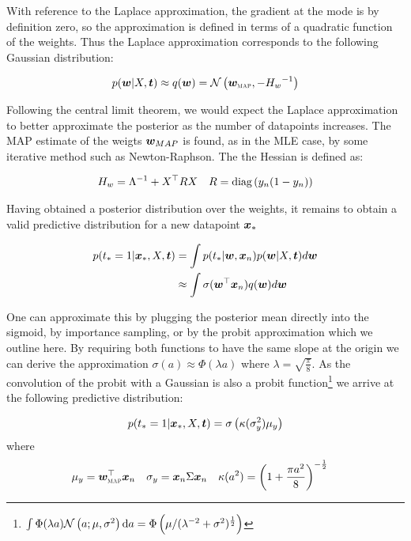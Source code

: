 With reference to the Laplace approximation, the gradient at the mode is by definition zero, so the approximation is defined in terms of a quadratic function of the weights. Thus the Laplace approximation corresponds to the following Gaussian distribution:

\begin{equation}
p(\bm w|X,\bm t) \approx q(\bm w) = \mathcal{N} \left( {\bm w_{\text{\tiny \sc MAP}}}, {-{H_w}^{-1}} \right)
\end{equation}

Following the central limit theorem, we would expect the Laplace approximation to better approximate the posterior as the number of datapoints increases. The MAP estimate of the weigts $\bm w_{MAP}$ is found, as in the MLE case, by some iterative method such as Newton-Raphson. The the Hessian is defined as:

\begin{align}
H_w   & = {\Lambda}^{-1} + X^\top R X & R = \text{diag} \left( {y_n(1 - y_n)} \right) 
\end{align}

Having obtained a posterior distribution over the weights, it remains to obtain a valid predictive distribution for a new datapoint $\bm x_*$

\begin{align}
p(t_* = 1| \bm x_*, X, \bm t) & = \int p(t_*|\bm w, \bm x_n)p(\bm w|X,\bm t) d\bm w \\
 & \approx \int \sigma(\bm w^\top\bm x_n)q(\bm w) d\bm w
\end{align}

One can approximate this by plugging the posterior mean directly into the sigmoid, by importance sampling, or by the probit approximation\cite{Barber1998} which we outline here. By requiring both functions to have the same slope at the origin we can derive the approximation $\sigma(a) \approx \Phi(\lambda a)$ where $\lambda = \sqrt{\frac{\pi}{8}}$. As the convolution of the probit with a Gaussian is also a probit function\footnote{$\int \Phi(\lambda a)\mathcal{N} \left(a; \mu, \sigma^2\right) \text{d}a = \Phi\left(\mu / (\lambda^{-2} + \sigma^2)^{\frac{1}{2}} \right)$} we arrive at the following predictive distribution:

\begin{align}
p(t_* = 1 | \bm x_*, X, \bm t) = \sigma\left( \kappa(\sigma_y^2) \mu_y \right)
\end{align}
where
\begin{align}
\mu_y       & = \bm w_{\text{\tiny \sc MAP}}^\top\bm x_n &
\sigma_y    & = \bm x_n \Sigma \bm x_n &
\kappa(a^2) & = \left( 1 + \frac{\pi a^2}{8}  \right)^{-\frac{1}{2}}
\end{align}


